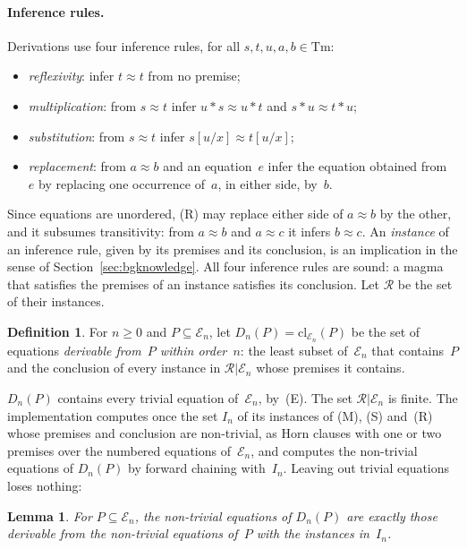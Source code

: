 \documentclass[11pt,a4paper]{article}
\newtheorem{lemma}[proposition]{Lemma}
\theoremstyle{definition}
\newtheorem{definition}{Definition}
\theoremstyle{remark}
\begin{document}
\paragraph{Inference rules.}
Derivations use four inference rules, for all $s, t, u, a, b \in \mathrm{Tm}$:
\begin{itemize}
  \item[(E)] \emph{reflexivity}: infer $t \approx t$ from no premise;
  \item[(M)] \emph{multiplication}: from $s \approx t$ infer $u * s \approx u * t$ and $s * u \approx t * u$;
  \item[(S)] \emph{substitution}: from $s \approx t$ infer $s[u/x] \approx t[u/x]$;
  \item[(R)] \emph{replacement}: from $a \approx b$ and an equation~$e$ infer the equation obtained from~$e$ by replacing one occurrence of~$a$, in either side, by~$b$.
\end{itemize}
Since equations are unordered, (R) may replace either side of $a \approx b$ by the other, and it subsumes transitivity: from $a \approx b$ and $a \approx c$ it infers $b \approx c$. An \emph{instance} of an inference rule, given by its premises and its conclusion, is an implication in the sense of Section~\ref{sec:bgknowledge}. All four inference rules are sound: a magma that satisfies the premises of an instance satisfies its conclusion. Let $\mathcal{R}$ be the set of their instances.

\begin{definition}
For $n \ge 0$ and $P \subseteq \mathcal{E}_n$, let $D_n(P) = \mathrm{cl}_{\mathcal{E}_n}(P)$ be the set of equations \emph{derivable from~$P$ within order~$n$}: the least subset of~$\mathcal{E}_n$ that contains~$P$ and the conclusion of every instance in $\mathcal{R}|\mathcal{E}_n$ whose premises it contains.
\end{definition}

$D_n(P)$ contains every trivial equation of~$\mathcal{E}_n$, by~(E). The set $\mathcal{R}|\mathcal{E}_n$ is finite. The implementation computes once the set $I_n$ of its instances of (M), (S) and~(R) whose premises and conclusion are non-trivial, as Horn clauses with one or two premises over the numbered equations of~$\mathcal{E}_n$, and computes the non-trivial equations of $D_n(P)$ by forward chaining with~$I_n$. Leaving out trivial equations loses nothing:

\begin{lemma}\label{lem:trivial}
For $P \subseteq \mathcal{E}_n$, the non-trivial equations of $D_n(P)$ are exactly those derivable from the non-trivial equations of~$P$ with the instances in~$I_n$.
\end{lemma}
\end{document}
